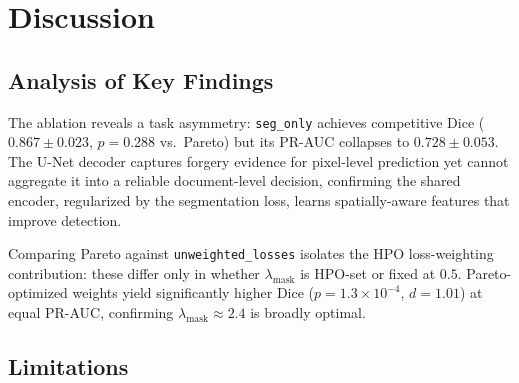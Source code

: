 
\section{Discussion}
\label{sec:discussion}

\subsection{Analysis of Key Findings}

The ablation reveals a task asymmetry: \texttt{seg\_only} achieves competitive
Dice ($0.867 \pm 0.023$, $p = 0.288$ vs.\ Pareto) but its PR-AUC collapses to
$0.728 \pm 0.053$. The U-Net decoder captures forgery evidence for pixel-level
prediction yet cannot aggregate it into a reliable document-level decision,
confirming the shared encoder, regularized by the segmentation loss, learns
spatially-aware features that improve detection.

Comparing Pareto against \texttt{unweighted\_losses} isolates the HPO
loss-weighting contribution: these differ only in whether $\lambda_{\text{mask}}$
is HPO-set  or fixed at
$0.5$. Pareto-optimized weights yield significantly higher Dice ($p =
1.3 \times 10^{-4}$, $d = 1.01$) at equal PR-AUC, confirming
$\lambda_{\text{mask}} \approx 2.4$ is broadly optimal. 

\subsection{Limitations}

\paragraph{}

